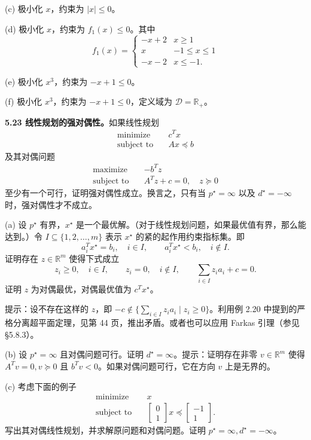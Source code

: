 \documentclass[UTF8, 12pt, fontset=fandol, oneside]{ctexart}
\begin{document}
(c) 极小化 $x$，约束为 $|x|\leq 0$。

(d) 极小化 $x$，约束为 $f_1(x)\leq 0$。其中
\[
f_1(x)=
\begin{cases}
-x+2 & x\geq 1\\
x & -1\leq x\leq 1\\
-x-2 & x\leq -1.
\end{cases}
\]

(e) 极小化 $x^3$，约束为 $-x+1\leq 0$。

(f) 极小化 $x^3$，约束为 $-x+1\leq 0$，定义域为 $\mathcal{D}=\mathbb{R}_+$。

\noindent\textbf{5.23 线性规划的强对偶性。}\quad 如果线性规划
\[
\begin{aligned}
\text{minimize}\quad & c^Tx\\
\text{subject to}\quad & Ax\preceq b
\end{aligned}
\]
及其对偶问题
\[
\begin{aligned}
\text{maximize}\quad & -b^Tz\\
\text{subject to}\quad & A^Tz+c=0,\quad z\succeq 0
\end{aligned}
\]
至少有一个可行，证明强对偶性成立。换言之，只有当 $p^\star=\infty$ 以及 $d^\star=-\infty$ 时，强对偶性才不成立。

(a) 设 $p^\star$ 有界，$x^\star$ 是一个最优解。（对于线性规划问题，如果最优值有界，那么能达到。）令 $I\subseteq\{1,2,\ldots,m\}$ 表示 $x^\star$ 的紧的起作用约束指标集。即
\[
a_i^Tx^\star=b_i,\quad i\in I,\qquad a_i^Tx^\star<b_i,\quad i\notin I.
\]
证明存在 $z\in\mathbb{R}^m$ 使得下式成立
\[
z_i\geq 0,\quad i\in I,\qquad z_i=0,\quad i\notin I,\qquad \sum_{i\in I}z_i a_i+c=0.
\]
证明 $z$ 为对偶最优，对偶最优值为 $c^Tx^\star$。

提示：设不存在这样的 $z$，即 $-c\notin\{\sum_{i\in I}z_i a_i\mid z_i\geq 0\}$。利用例 2.20 中提到的严格分离超平面定理，见第 44 页，推出矛盾。或者也可以应用 Farkas 引理（参见 §5.8.3）。

(b) 设 $p^\star=\infty$ 且对偶问题可行。证明 $d^\star=\infty$。提示：证明存在非零 $v\in\mathbb{R}^m$ 使得 $A^Tv=0, v\succeq 0$ 且 $b^Tv<0$。如果对偶问题可行，它在方向 $v$ 上是无界的。

(c) 考虑下面的例子
\[
\begin{aligned}
\text{minimize}\quad & x\\
\text{subject to}\quad &
\begin{bmatrix}
0\\
1
\end{bmatrix}x\preceq
\begin{bmatrix}
-1\\
1
\end{bmatrix}.
\end{aligned}
\]
写出其对偶线性规划，并求解原问题和对偶问题。证明 $p^\star=\infty, d^\star=-\infty$。
\end{document}
